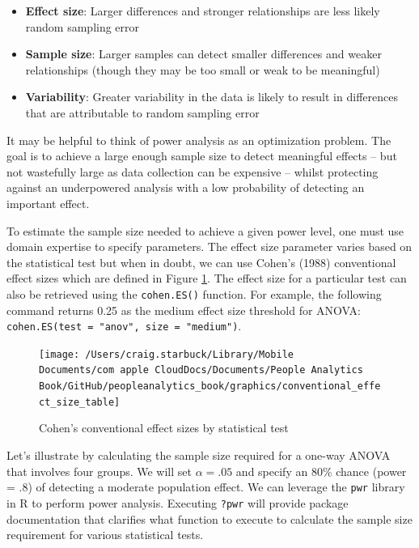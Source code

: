 \documentclass[
]{book}
\providecommand{\tightlist}{%
  \setlength{\itemsep}{0pt}\setlength{\parskip}{0pt}}
\begin{document}
\begin{itemize}
\tightlist
\item
  \textbf{Effect size}: Larger differences and stronger relationships are less likely random sampling error
\item
  \textbf{Sample size}: Larger samples can detect smaller differences and weaker relationships (though they may be too small or weak to be meaningful)
\item
  \textbf{Variability}: Greater variability in the data is likely to result in differences that are attributable to random sampling error
\end{itemize}

It may be helpful to think of power analysis as an optimization problem. The goal is to achieve a large enough sample size to detect meaningful effects -- but not wastefully large as data collection can be expensive -- whilst protecting against an underpowered analysis with a low probability of detecting an important effect.

To estimate the sample size needed to achieve a given power level, one must use domain expertise to specify parameters. The effect size parameter varies based on the statistical test but when in doubt, we can use Cohen's (1988) conventional effect sizes which are defined in Figure \ref{fig:conv-eff-size-tbl}. The effect size for a particular test can also be retrieved using the \texttt{cohen.ES()} function. For example, the following command returns 0.25 as the medium effect size threshold for ANOVA: \texttt{cohen.ES(test\ =\ "anov",\ size\ =\ "medium")}.

\begin{figure}

{\centering \texttt{[image: /Users/craig.starbuck/Library/Mobile Documents/com~apple~CloudDocs/Documents/People Analytics Book/GitHub/peopleanalytics\_book/graphics/conventional\_effect\_size\_table]} 

}

\caption{Cohen's conventional effect sizes by statistical test}\label{fig:conv-eff-size-tbl}
\end{figure}

Let's illustrate by calculating the sample size required for a one-way ANOVA that involves four groups. We will set \(\alpha = .05\) and specify an 80\% chance (power = .8) of detecting a moderate population effect. We can leverage the \texttt{pwr} library in R to perform power analysis. Executing \texttt{?pwr} will provide package documentation that clarifies what function to execute to calculate the sample size requirement for various statistical tests.
\end{document}
